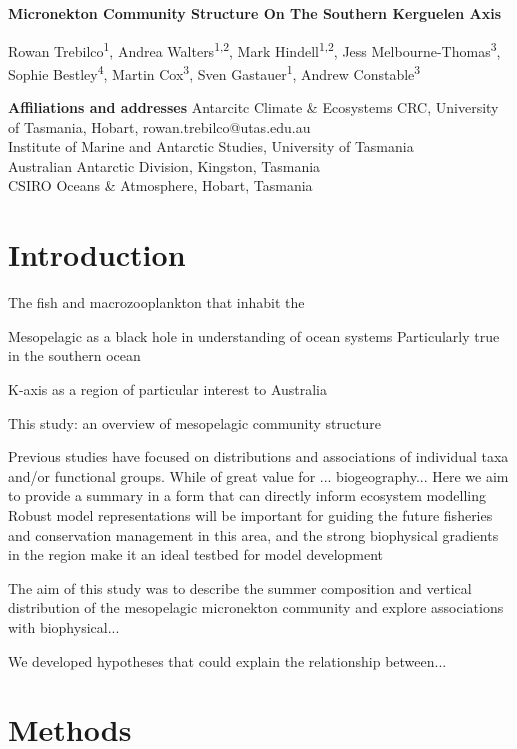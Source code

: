 \documentclass{article}
\begin{document}
\large{\textbf{Micronekton Community Structure On The Southern Kerguelen Axis}}

Rowan Trebilco\textsuperscript{1},
Andrea Walters\textsuperscript{1,2},
Mark Hindell\textsuperscript{1,2},
Jess Melbourne-Thomas\textsuperscript{3},
Sophie Bestley\textsuperscript{4},
Martin Cox\textsuperscript{3},
Sven Gastauer\textsuperscript{1},
Andrew Constable\textsuperscript{3}


\textbf{Affiliations and addresses}
 Antarcitc Climate & Ecosystems CRC, University of Tasmania, Hobart, rowan.trebilco@utas.edu.au\\
 Institute of Marine and Antarctic Studies, University of Tasmania\\ 
 Australian Antarctic Division, Kingston, Tasmania\\ 
 CSIRO Oceans & Atmosphere, Hobart, Tasmania


\linenumbers
\section{Introduction}

The fish and macrozooplankton that inhabit the 

Mesopelagic as a black hole in understanding of ocean systems
Particularly true in the southern ocean

K-axis as a region of particular interest to Australia

This study: an overview of mesopelagic community structure

Previous studies have focused on distributions and associations of individual taxa and/or functional groups. 
While of great value for ... biogeography... 
Here we aim to provide a summary in a form that can directly inform ecosystem modelling 
Robust model representations will be important for guiding the future fisheries and conservation management in this area, and the strong biophysical gradients in the region make it an ideal testbed for model development

The aim of this study was to describe the summer composition and vertical distribution of the mesopelagic micronekton community and explore associations with biophysical...

We developed hypotheses that could explain the relationship between...


\section{Methods}
\end{document}
